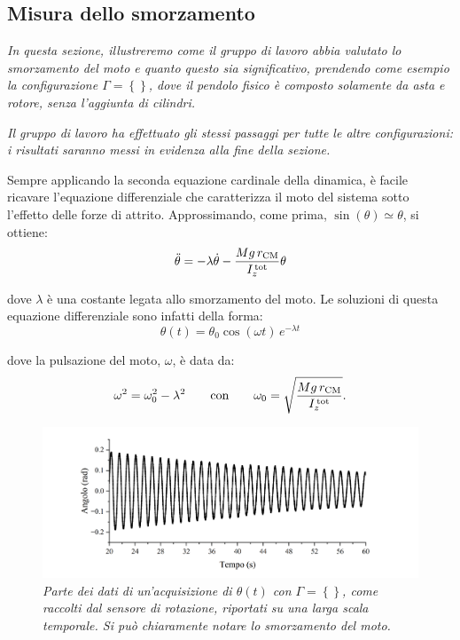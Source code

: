 \documentclass{article}
\begin{document}
\subsection{Misura dello smorzamento}

\emph{
  In questa sezione, illustreremo come il gruppo di lavoro abbia
  valutato lo smorzamento del moto e quanto questo sia significativo,
  prendendo come esempio la configurazione $\Gamma=\left\{\right\}$,
  dove il pendolo fisico è composto solamente da asta e rotore, senza
  l'aggiunta di cilindri.
}

\emph{
  Il gruppo di lavoro ha effettuato gli stessi passaggi per tutte le
  altre configurazioni: i risultati saranno messi in evidenza alla
  fine della sezione.
}
\vspace{2mm}

Sempre applicando la seconda equazione cardinale della dinamica,
è facile ricavare l'equazione differenziale che caratterizza il moto
del sistema sotto l'effetto delle forze di attrito.
Approssimando, come prima, $\sin(\theta)\simeq\theta$, si ottiene:
\[ \ddot{\theta} = -\lambda\dot{\theta} -\frac{Mg\,r_\text{CM}}{I_z^\text{\,tot}} \theta \]

dove $\lambda$ è una costante legata allo smorzamento del moto.
Le soluzioni di questa equazione differenziale sono infatti della forma:
\[\theta(t) = \theta_0\cos(\omega t)\,e^{-\lambda t}\]

dove la pulsazione del moto, $\omega$, è data da:
\[
  \omega^2 = \omega_0^2 - \lambda^2
  \qquad\text{con}\qquad
  \omega_0 = \sqrt{\frac{Mg\,r_\text{CM}}{I_z^\text{\,tot}}}.
\]

\begin{center}
    \begin{figure}[H]
        \includegraphics[trim={2cm .5cm 2cm .5cm},clip,width=\textwidth]{img/Graph1.png}
        \caption[]{\emph{
            Parte dei dati di un'acquisizione di $\theta(t)$
            con $\Gamma=\left\{\right\}$,
            come raccolti dal sensore di rotazione,
            riportati su una larga scala temporale.
            Si può chiaramente notare lo smorzamento
            del moto.
        }}
    \end{figure}
\end{center}
\end{document}
